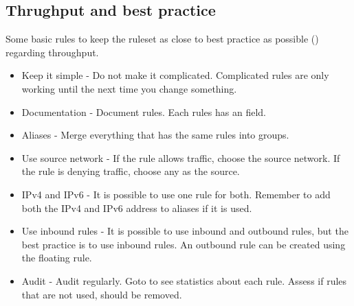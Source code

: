 


\subsection{Thrughput and best practice}
Some basic rules to keep the ruleset as close to best practice as possible (\cite{Stubbig2019}) regarding throughput.

\begin{itemize}
    \item Keep it simple - Do not make it complicated. Complicated rules are only working until the next time you change something.
    \item Documentation - Document rules. Each rules has an  field.
    \item Aliases - Merge everything that has the same rules into groups.
    \item Use source network - If the rule allows traffic, choose the source network. If the rule is denying traffic, choose any as the source.
    \item IPv4 and IPv6 - It is possible to use one rule for both. Remember to add both the IPv4 and IPv6 address to aliases if it is used.
    \item Use inbound rules - It is possible to use inbound and outbound rules, but the best practice is to use inbound rules. An outbound rule can be created using the floating rule.
    \item Audit - Audit regularly. Goto  to see statistics about each rule. Assess if rules that are not used, should be removed.
\end{itemize}

